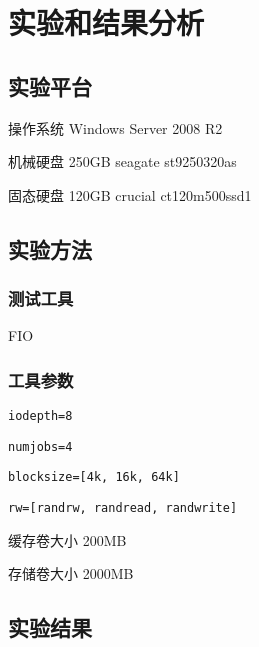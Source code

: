 
\chapter{实验和结果分析}
\label{cha:exp_analysis}

\section{实验平台}
\label{sec:exp_platform}

操作系统 Windows Server 2008 R2

机械硬盘 250GB seagate st9250320as

固态硬盘 120GB crucial ct120m500ssd1

\section{实验方法}
\label{sec:exp_method}

\subsection{测试工具}
FIO

\subsection{工具参数}
\begin{lstlisting}
iodepth=8
\end{lstlisting}

\begin{lstlisting}
numjobs=4
\end{lstlisting}

\begin{lstlisting}
blocksize=[4k, 16k, 64k]
\end{lstlisting}

\begin{lstlisting}
rw=[randrw, randread, randwrite]
\end{lstlisting}

缓存卷大小 200MB

存储卷大小 2000MB

\section{实验结果}
\label{sec:exp_results}

